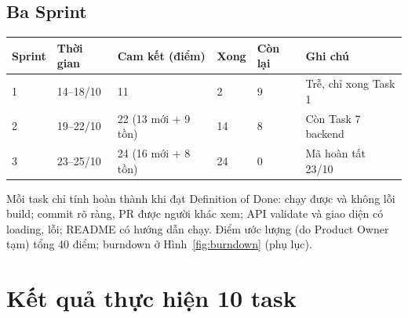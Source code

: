 \documentclass[a4paper]{article}
\begin{document}
\subsection{Ba Sprint}
\begin{center}
\small\everymath{}
\begin{tabular}{@{}p{1.4cm}p{2.0cm}p{3.0cm}p{1.2cm}p{1.5cm}p{3.2cm}@{}}
\toprule
\textbf{Sprint} & \textbf{Thời gian} & \textbf{Cam kết (điểm)} & \textbf{Xong} & \textbf{Còn lại} & \textbf{Ghi chú} \\ \midrule
1 & 14--18/10 & 11 & 2 & 9 & Trễ, chỉ xong Task 1 \\
2 & 19--22/10 & 22 (13 mới + 9 tồn) & 14 & 8 & Còn Task 7 backend \\
3 & 23--25/10 & 24 (16 mới + 8 tồn) & 24 & 0 & Mã hoàn tất 23/10 \\
\bottomrule
\end{tabular}
\end{center}
Mỗi task chỉ tính hoàn thành khi đạt Definition of Done: chạy được và không lỗi build; commit rõ ràng, PR được người khác xem; API validate và giao diện có loading, lỗi; README có hướng dẫn chạy. Điểm ước lượng (do Product Owner tạm) tổng 40 điểm; burndown ở Hình~\ref{fig:burndown} (phụ lục).

\section{Kết quả thực hiện 10 task}
\end{document}
